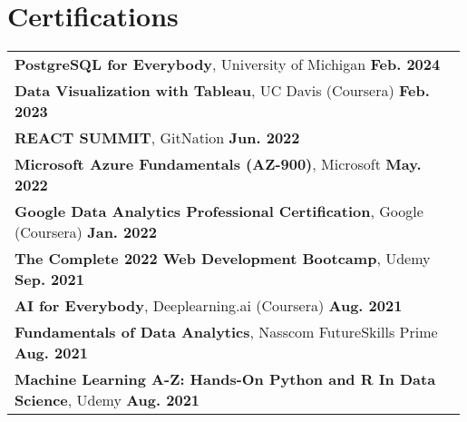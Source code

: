 \documentclass[letterpaper,11pt]{article}
\begin{document}
\section{Certifications}
\begin{tabular}{p{0.99\linewidth}}
    \hspace{0.15in}\textbf{PostgreSQL for Everybody}, University of Michigan
        \hfill \textbf{Feb. 2024} \\
    \hspace{0.15in}\textbf{Data Visualization with Tableau}, UC Davis (Coursera)
        \hfill \textbf{Feb. 2023} \\
    \hspace{0.15in}\textbf{REACT SUMMIT}, GitNation
        \hfill \textbf{Jun. 2022} \\
    \hspace{0.15in}\textbf{Microsoft Azure Fundamentals (AZ-900)}, Microsoft
        \hfill \textbf{May. 2022} \\
    \hspace{0.15in}\textbf{Google Data Analytics Professional Certification}, Google (Coursera)
        \hfill \textbf{Jan. 2022} \\
    \hspace{0.15in}\textbf{The Complete 2022 Web Development Bootcamp}, Udemy
        \hfill \textbf{Sep. 2021} \\
    \hspace{0.15in}\textbf{AI for Everybody}, Deeplearning.ai (Coursera)
        \hfill \textbf{Aug. 2021} \\
    \hspace{0.15in}\textbf{Fundamentals of Data Analytics}, Nasscom FutureSkills Prime
        \hfill \textbf{Aug. 2021} \\
    \hspace{0.15in}\textbf{Machine Learning A-Z: Hands-On Python and R In Data Science}, Udemy
        \hfill \textbf{Aug. 2021} \\
\end{tabular}
\end{document}
